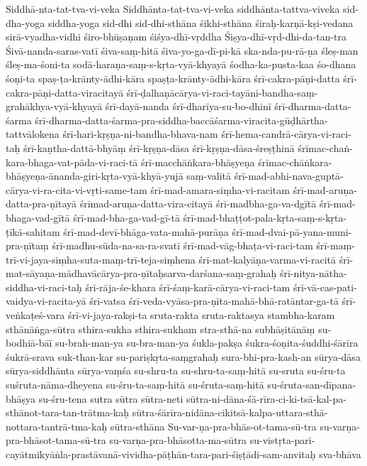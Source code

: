 {Siddhā-nta-tat-tva-vi-veka
Siddhānta-tat-tva-vi-veka
siddhānta-tattva-viveka
sid-dha-yoga
siddha-yoga
sid-dhi
sid-dhi-sthāna
śikhi-sthāna
śiraḥ-karṇā-kṣi-vedana
    sirā-vyadha-vidhi
śiro-bhūṣaṇam
śiśya-dhī-vṛddha
Śiṣya-dhī-vṛd-dhi-da-tan-tra
Śivā-nanda-saras-vatī
śiva-saṃ-hitā
śiva-yo-ga-dī-pi-kā
ska-nda-pu-rā-ṇa
śleṣ-man
śleṣ-ma-śoni-ta
sodā-haraṇa-saṃ-s-kṛta-vyā-khyayā
śodha-ka-pusta-kaa
śo-dhana
śoṇi-ta
spaṣ-ṭa-krānty-ādhi-kāra
spaṣṭa-krānty-ādhi-kāra
śrī-cakra-pāṇi-datta
śrī-cakra-pāṇi-datta-viracitayā
śrī-ḍalhaṇācārya-vi-raci-tayāni-bandha-saṃ-grahākhya-vyā-khyayā
śrī-dayā-nanda
    śrī-dharīya-su-bo-dhinī 
    śrī-dharma-datta-śarma 
 śrī-dharma-datta-śarma-pra-siddha-baccāśarma-viracita-gūḍhārtha-tattvālokena
śrī-hari-kṛṣṇa-ni-bandha-bhava-nam
śrī-hema-candrā-cārya-vi-raci-taḥ
śrī-kaṇtha-dattā-bhyāṃ
śrī-kṛṣṇa-dāsa
śrī-kṛṣṇa-dāsa-śreṣṭhinā
śrīmac-chaṅ-kara-bhaga-vat-pāda-vi-raci-tā
    śrī-macchāṅkara-bhāṣyeṇa
 śrīmac-chāṅkara-bhāṣyeṇa-ānanda-giri-kṛta-vyā-khyā-yujā saṃ-valitā 
śrī-mad-abhi-nava-guptā-cārya-vi-ra-cita-vi-vṛti-same-tam
śrī-mad-amara-siṃha-vi-racitam
    śrī-mad-aruṇa-datta-pra-ṇītayā
    śrīmad-aruṇa-datta-vira-citayā
    śrī-madbha-ga-va-dgītā
 śrī-mad-bhaga-vad-gītā 
śrī-mad-bha-ga-vad-gī-tā
śrī-mad-bhaṭṭot-pala-kṛta-saṃ-s-kṛta-ṭīkā-sahitam
śrī-mad-devī-bhāga-vata-mahā-purāṇa
śrī-mad-dvai-pā-yana-muni-pra-ṇītaṃ
    śrī-madhu-sūda-na-sa-ra-svatī 
śrī-mad-vāg-bhaṭa-vi-raci-tam
śrī-maṃ-trī-vi-jaya-siṃha-suta-maṃ-trī-teja-siṃhena
śrī-mat-kalyāṇa-varma-vi-racitā
śrī-mat-sāyaṇa-mādhavācārya-pra-ṇītaḥsarva-darśana-saṃ-grahaḥ
śrī-nitya-nātha-siddha-vi-raci-taḥ
śrī-rāja-śe-khara
śrī-śaṃ-karā-cārya-vi-raci-tam
śrī-vā-cas-pati-vaidya-vi-racita-yā
śrī-vatsa
śrī-veda-vyāsa-pra-ṇīta-mahā-bhā-ratāntar-ga-tā
śrī-veṅkaṭeś-vara
śrī-vi-jaya-rakṣi-ta
sruta-rakta
sruta-raktasya
stambha-karam
sthānāṅga-sūtra
sthira-sukha
sthira-sukham
stra-sthā-na
subhāṣitānāṃ
su-bodhiā-bāī
su-brah-man-ya
su-bra-man-ya
śukla-pakṣa
    śukra-śoṇita-śuddhi-śārīra
śukrā-srava
suk-than-kar
su-pariṣkṛta-saṃgrahaḥ
sura-bhi-pra-kash-an
sūrya-dāsa
sūrya-siddhānta
sūrya-vaṃśa
su-shru-ta
su-shru-ta-saṃ-hitā
su-sruta
su-śru-ta
suśruta-nāma-dheyena
su-śru-ta-saṃ-hitā
su-śruta-saṃ-hitā
su-śruta-san-dīpana-bhāṣya
su-śru-tena
sutra
sūtra
sūtra-neti
sūtra-ni-dāna-śā-rīra-ci-ki-tsā-kal-pa-sthānot-tara-tan-trātma-kaḥ
    sūtra-śārīra-nidāna-cikitsā-kalpa-uttara-sthā-nottara-tantrā-tma-kaḥ 
sūtra-sthāna
Su-var-ṇa-pra-bhās-ot-tama-sū-tra
su-varṇa-pra-bhāsot-tama-sū-tra
su-varṇa-pra-bhāsotta-ma-sūtra
su-vistṛta-pari-cayātmikyāṅla-prastāvanā-vividha-pāṭhān-tara-pari-śiṣṭādi-sam-anvitaḥ
    sva-bhāva
}
